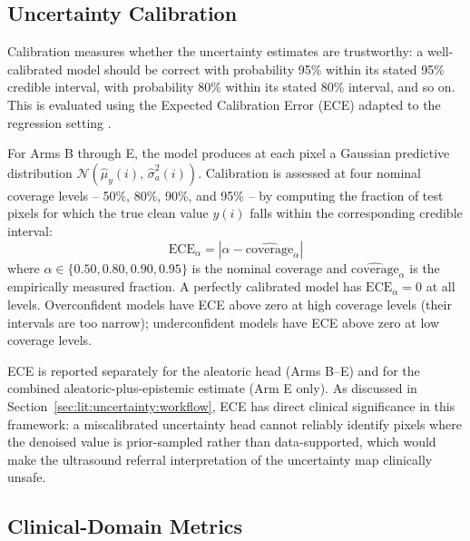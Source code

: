 \documentclass[12pt, a4paper, twoside, openright]{book}
\begin{document}
\subsection{Uncertainty Calibration}
\label{sec:methods:evaluation:calibration}

Calibration measures whether the uncertainty estimates are trustworthy: a well-calibrated
model should be correct with probability 95\% within its stated 95\% credible interval, with
probability 80\% within its stated 80\% interval, and so on. This is evaluated using the
Expected Calibration Error (ECE) adapted to the regression setting \cite{naeini_obtaining_2015}.

For Arms B through E, the model produces at each pixel a Gaussian predictive distribution
$\mathcal{N}(\hat{\mu}_y(i),\, \hat{\sigma}^2_a(i))$. Calibration is assessed at four nominal
coverage levels -- 50\%, 80\%, 90\%, and 95\% -- by computing the fraction of test pixels
for which the true clean value $y(i)$ falls within the corresponding credible interval:
\begin{equation}
\label{eq:methods:ece}
\mathrm{ECE}_\alpha = \left|\alpha - \widehat{\mathrm{coverage}}_\alpha\right|
\end{equation}
where $\alpha \in \{0.50, 0.80, 0.90, 0.95\}$ is the nominal coverage and
$\widehat{\mathrm{coverage}}_\alpha$ is the empirically measured fraction. A perfectly
calibrated model has $\mathrm{ECE}_\alpha = 0$ at all levels. Overconfident models have
ECE above zero at high coverage levels (their intervals are too narrow); underconfident models
have ECE above zero at low coverage levels.

ECE is reported separately for the aleatoric head (Arms B--E) and for the combined
aleatoric-plus-epistemic estimate (Arm E only). As discussed in
Section~\ref{sec:lit:uncertainty:workflow}, ECE has direct clinical significance in this framework:
a miscalibrated uncertainty head cannot reliably identify pixels where the denoised value
is prior-sampled rather than data-supported, which would make the ultrasound referral
interpretation of the uncertainty map clinically unsafe.

\subsection{Clinical-Domain Metrics}
\label{sec:methods:evaluation:clinical}
\end{document}
